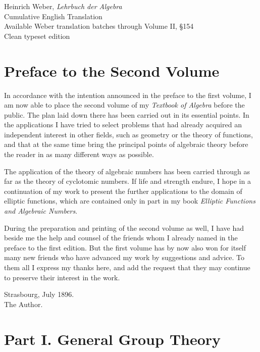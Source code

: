 \documentclass[11pt,a4paper]{book}
\begin{document}
\begin{titlepage}
\centering
\vspace*{0.25\textheight}
{\Large Heinrich Weber, \emph{Lehrbuch der Algebra}\\[0.8em]}
{\LARGE Cumulative English Translation\\[0.8em]}
{\large Available Weber translation batches through Volume II, \S154\\[1em]}
{\large Clean typeset edition}
\vfill
\end{titlepage}
\chapter*{Preface to the Second Volume}
In accordance with the intention announced in the preface to the first volume, I am now able to place the second volume of my \emph{Textbook of Algebra} before the public. The plan laid down there has been carried out in its essential points. In the applications I have tried to select problems that had already acquired an independent interest in other fields, such as geometry or the theory of functions, and that at the same time bring the principal points of algebraic theory before the reader in as many different ways as possible.

The application of the theory of algebraic numbers has been carried through as far as the theory of cyclotomic numbers. If life and strength endure, I hope in a continuation of my work to present the further applications to the domain of elliptic functions, which are contained only in part in my book \emph{Elliptic Functions and Algebraic Numbers}.

During the preparation and printing of the second volume as well, I have had beside me the help and counsel of the friends whom I already named in the preface to the first edition. But the first volume has by now also won for itself many new friends who have advanced my work by suggestions and advice. To them all I express my thanks here, and add the request that they may continue to preserve their interest in the work.

\begin{flushright}
Strasbourg, July 1896.\\
The Author.
\end{flushright}

\chapter*{Part I. General Group Theory}
\end{document}
